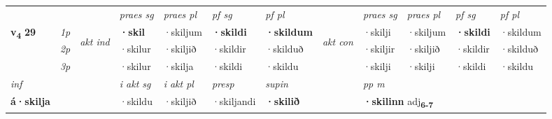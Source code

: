 \begin{longtable}[l]{X>{\footnotesize\itshape}llXXXXlXXXX}
 & &   & \textit{praes sg}  & \textit{praes pl}    & \textit{ pf sg} & \textit{pf pl} & & \textit{praes sg}  & \textit{praes pl}    & \textit{pf sg} & \textit{pf pl }  \\ \cmidrule{4-7} \cmidrule{9-12}
 \multirow{2}{*}{{{\textbf{v{\textsubscript{4}}} \Large{\textbf{29}}}}}  & 1p & \multirow{3}{*}{\begin{turn}{90}\textit{akt ind}\end{turn}} & \textbf{·skil} & ·skiljum & \textbf{·skildi} & \textbf{·skildum} & \multirow{3}{*}{\begin{turn}{90}\textit{akt con}\end{turn}} &·skilji & ·skiljum & \textbf{·skildi} & ·skildum\\*
 & 2p &  &  ·skilur  & ·skiljið & ·skildir & ·skilduð & & ·skiljir & ·skiljið & ·skildir & ·skilduð \\*
 & 3p &  & ·skilur & ·skilja & ·skildi & ·skildu & & ·skilji & ·skilji& ·skildi & ·skildu \\*
\cmidrule{4-7} \cmidrule{9-12}

   {\textit{inf}} & &  & \textit{i akt sg} & \textit{i akt pl}   & \textit{presp} & \textit{supin}  && \textit{pp m} \\*
  {\textbf{á\allowbreak ·skilja}} & && ·skildu  & ·skiljið   & ·skiljandi &  \textbf{·skilið}  && \multicolumn{2}{l}{\textbf{·skilinn} adj\textbf{\textsubscript{6-7}}} \\*

\midrule


\end{longtable}

